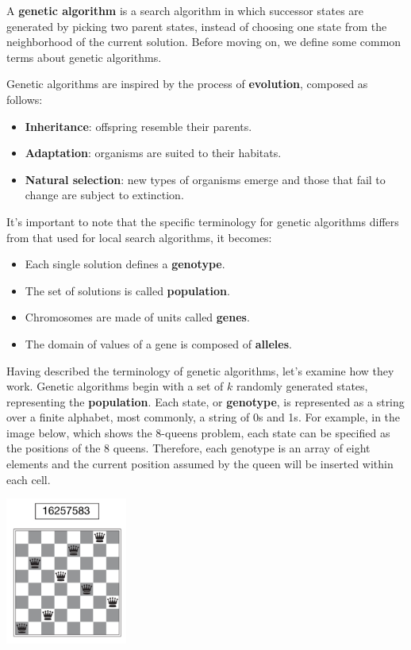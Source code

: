 A \textbf{genetic algorithm} is a search algorithm in which successor states are generated by picking two parent states, instead of choosing one state from the neighborhood of
the current solution. Before moving on, we define some common terms about genetic algorithms. \vspace{3.5pt}

Genetic algorithms are inspired by the process of \textbf{evolution}, composed as follows:
\begin{itemize}
    \renewcommand{\labelitemi}{-}
    \item \textbf{Inheritance}: offspring resemble their parents.
    \item \textbf{Adaptation}: organisms are suited to their habitats.
    \item \textbf{Natural selection}: new types of organisms emerge and those that fail to change are subject to extinction.
\end{itemize}

It's important to note that the specific terminology for genetic algorithms differs from that used for local search algorithms, it becomes:
\begin{itemize}
    \renewcommand{\labelitemi}{-}
    \item Each single solution defines a \textbf{genotype}.
    \item The set of solutions is called \textbf{population}.
    \item Chromosomes are made of units called \textbf{genes}.
    \item The domain of values of a gene is composed of \textbf{alleles}.
\end{itemize} \vspace{3.5pt}

Having described the terminology of genetic algorithms, let's examine how they work. Genetic algorithms begin with a set of $k$ randomly generated states, representing the
\textbf{population}. Each state, or \textbf{genotype}, is represented as a string over a finite alphabet, most commonly, a string of 0s and 1s. For example, in the image
below, which shows the 8-queens problem, each state can be specified as the positions of the 8 queens. Therefore, each genotype is an array of eight elements and the current 
position assumed by the queen will be inserted within each cell. \vspace{3.5pt}
\begin{center}
    \includegraphics[width=0.3\textwidth]{img/img6.png}
\end{center} \vspace{3.5pt}


